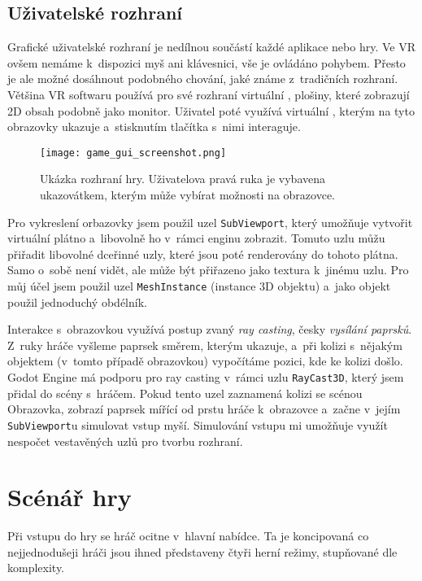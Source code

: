 \label{uzivatelske_rozhrani}
\section{Uživatelské rozhraní}

Grafické uživatelské rozhraní je nedílnou součástí každé aplikace nebo hry. Ve VR ovšem nemáme k~dispozici myš ani klávesnici, vše je ovládáno pohybem. Přesto je ale možné dosáhnout podobného chování, jaké známe z~tradičních rozhraní. Většina VR softwaru používá pro své rozhraní virtuální , plošiny, které zobrazují 2D obsah podobně jako monitor. Uživatel poté využívá virtuální , kterým na tyto obrazovky ukazuje a~stisknutím tlačítka s~nimi interaguje.

\begin{figure}[H]
  \centering
  \texttt{[image: game\_gui\_screenshot.png]}
  \caption{Ukázka rozhraní hry. Uživatelova pravá ruka je vybavena ukazovátkem, kterým může vybírat možnosti na obrazovce.}
  \label{game_gui_screenshot}
\end{figure}

Pro vykreslení orbazovky jsem použil uzel \texttt{SubViewport}, který umožňuje vytvořit virtuální plátno a~libovolně ho v~rámci enginu zobrazit. Tomuto uzlu můžu přiřadit libovolné dceřinné uzly, které jsou poté renderovány do tohoto plátna. Samo o~sobě není vidět, ale může být přiřazeno jako textura k~jinému uzlu. Pro můj účel jsem použil uzel \texttt{MeshInstance} (instance 3D objektu) a~jako objekt použil jednoduchý obdélník.

Interakce s~obrazovkou využívá postup zvaný \textit{ray casting}, česky \textit{vysílání paprsků}. Z~ruky hráče vyšleme paprsek směrem, kterým ukazuje, a~při kolizi s~nějakým objektem (v~tomto případě obrazovkou) vypočítáme pozici, kde ke kolizi došlo. Godot Engine má podporu pro ray casting v~rámci uzlu \texttt{RayCast3D}, který jsem přidal do scény s~hráčem. Pokud tento uzel zaznamená kolizi se scénou Obrazovka, zobrazí paprsek mířící od prstu hráče k~obrazovce a~začne v~jejím \texttt{SubViewport}u simulovat vstup myší. Simulování vstupu mi umožňuje využít nespočet vestavěných uzlů pro tvorbu rozhraní.

\chapter{Scénář hry}

Při vstupu do hry se hráč ocitne v~hlavní nabídce. Ta je koncipovaná co nejjednodušeji \poml hráči jsou ihned představeny čtyři herní režimy, stupňované dle komplexity.

